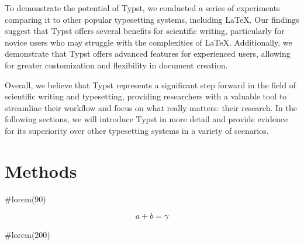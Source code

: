 To demonstrate the potential of Typst, we conducted a series of experiments comparing it to other popular typesetting systems, including LaTeX. Our findings suggest that Typst offers several benefits for scientific writing, particularly for novice users who may struggle with the complexities of LaTeX. Additionally, we demonstrate that Typst offers advanced features for experienced users, allowing for greater customization and flexibility in document creation.

Overall, we believe that Typst represents a significant step forward in the field of scientific writing and typesetting, providing researchers with a valuable tool to streamline their workflow and focus on what really matters: their research. In the following sections, we will introduce Typst in more detail and provide evidence for its superiority over other typesetting systems in a variety of scenarios.

\section{Methods}
\iftypst
#lorem(90)
\fi

$$ a + b = \gamma $$

\iftypst
#lorem(200)
\fi